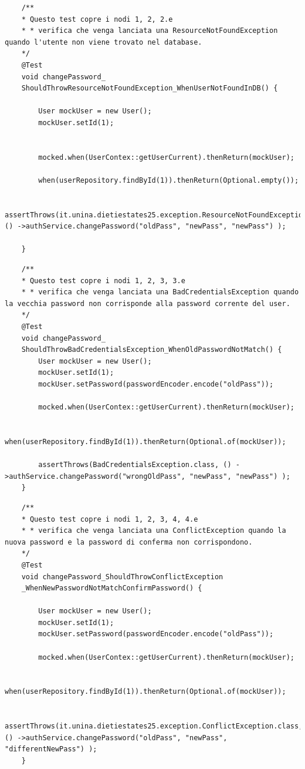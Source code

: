\begin{lstlisting}
	/**
	* Questo test copre i nodi 1, 2, 2.e
	* * verifica che venga lanciata una ResourceNotFoundException quando l'utente non viene trovato nel database.
	*/
	@Test
	void changePassword_
	ShouldThrowResourceNotFoundException_WhenUserNotFoundInDB() {
		
		User mockUser = new User();
		mockUser.setId(1);
		
		
		mocked.when(UserContex::getUserCurrent).thenReturn(mockUser);
		
		when(userRepository.findById(1)).thenReturn(Optional.empty());
		
		assertThrows(it.unina.dietiestates25.exception.ResourceNotFoundException.class, () ->authService.changePassword("oldPass", "newPass", "newPass") );
		
	}
\end{lstlisting}
	
\begin{lstlisting}
	/**
	* Questo test copre i nodi 1, 2, 3, 3.e
	* * verifica che venga lanciata una BadCredentialsException quando la vecchia password non corrisponde alla password corrente del user.
	*/
	@Test
	void changePassword_
	ShouldThrowBadCredentialsException_WhenOldPasswordNotMatch() {
		User mockUser = new User();
		mockUser.setId(1);
		mockUser.setPassword(passwordEncoder.encode("oldPass"));
		
		mocked.when(UserContex::getUserCurrent).thenReturn(mockUser);
		
		when(userRepository.findById(1)).thenReturn(Optional.of(mockUser));
		
		assertThrows(BadCredentialsException.class, () ->authService.changePassword("wrongOldPass", "newPass", "newPass") );
	}
\end{lstlisting}

\begin{lstlisting}
	/**
	* Questo test copre i nodi 1, 2, 3, 4, 4.e
	* * verifica che venga lanciata una ConflictException quando la nuova password e la password di conferma non corrispondono.
	*/
	@Test
	void changePassword_ShouldThrowConflictException
	_WhenNewPasswordNotMatchConfirmPassword() {
		
		User mockUser = new User();
		mockUser.setId(1);
		mockUser.setPassword(passwordEncoder.encode("oldPass"));
		
		mocked.when(UserContex::getUserCurrent).thenReturn(mockUser);
		
		when(userRepository.findById(1)).thenReturn(Optional.of(mockUser));
		
		assertThrows(it.unina.dietiestates25.exception.ConflictException.class, () ->authService.changePassword("oldPass", "newPass", "differentNewPass") );
	}
\end{lstlisting}

